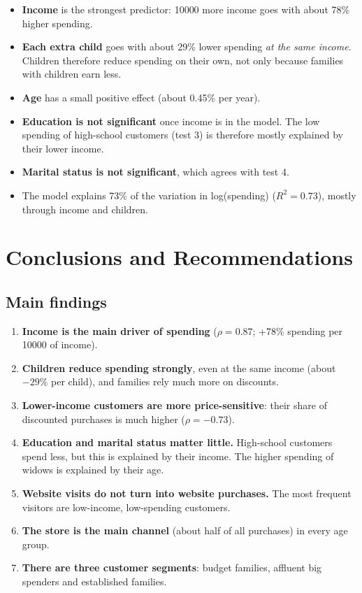 \documentclass[11pt,a4paper]{article}
\begin{document}
\begin{itemize}
	\item \textbf{Income} is the strongest predictor: \num{10000} more income goes with about 78\% higher spending.
	\item \textbf{Each extra child} goes with about 29\% lower spending \emph{at the same income}. Children therefore reduce spending on their own, not only because families with children earn less.
	\item \textbf{Age} has a small positive effect (about 0.45\% per year).
	\item \textbf{Education is not significant} once income is in the model. The low spending of high-school customers (test 3) is therefore mostly explained by their lower income.
	\item \textbf{Marital status is not significant}, which agrees with test 4.
	\item The model explains 73\% of the variation in log(spending) ($R^2 = 0.73$), mostly through income and children.
\end{itemize}

\section{Conclusions and Recommendations}
\subsection{Main findings}
\begin{enumerate}
	\item \textbf{Income is the main driver of spending} ($\rho = 0.87$; +78\% spending per \num{10000} of income).
	\item \textbf{Children reduce spending strongly}, even at the same income (about $-29\%$ per child), and families rely much more on discounts.
	\item \textbf{Lower-income customers are more price-sensitive}: their share of discounted purchases is much higher ($\rho = -0.73$).
	\item \textbf{Education and marital status matter little.} High-school customers spend less, but this is explained by their income. The higher spending of widows is explained by their age.
	\item \textbf{Website visits do not turn into website purchases.} The most frequent visitors are low-income, low-spending customers.
	\item \textbf{The store is the main channel} (about half of all purchases) in every age group.
	\item \textbf{There are three customer segments}: budget families, affluent big spenders and established families.
\end{enumerate}
\end{document}
